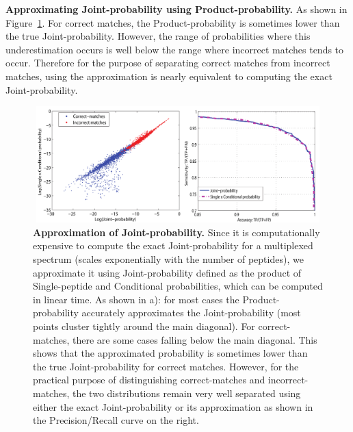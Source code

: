 \documentclass[arial,11pt]{article}
\begin{document}
{\bf Approximating Joint-probability using Product-probability.} %
As shown in Figure~\ref{approximate}.
 For correct matches, the Product-probability is sometimes lower than the true Joint-probability.
However, the range of probabilities where this underestimation occurs is well below the range where incorrect matches tends to occur.  Therefore for the purpose of separating correct matches from incorrect matches, using the approximation is nearly equivalent to computing the exact Joint-probability.

\begin{figure}[!htp]
	\centering
	 \includegraphics[height=45mm, width=125mm]{figures/MixGF_approx_joint_by_product_distrib_plus_ROC}
		\caption{\footnotesize {\bf Approximation of Joint-probability.}
  	Since it is computationally expensive to compute the exact Joint-probability for a multiplexed spectrum (scales exponentially with the number of peptides), we approximate it using Joint-probability defined as the product of Single-peptide and Conditional probabilities, which can be computed in linear time. As shown in a): for most cases the Product-probability accurately approximates the Joint-probability (most points cluster tightly around the main diagonal).  For correct-matches, there are some cases falling below the main diagonal. This shows that the approximated probability is sometimes lower than the true Joint-probability for correct matches.  However, for the practical purpose of distinguishing correct-matches and incorrect-matches, the two distributions remain very well separated using either the exact Joint-probability or its approximation as shown in the Precision/Recall curve on the right.}
\label{approximate}
\end{figure}
\end{document}
